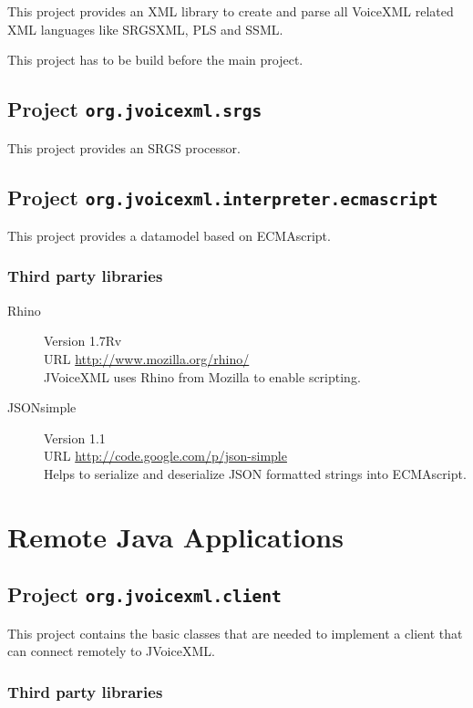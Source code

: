 \documentclass[11pt,a4paper]{article}
\begin{document}
This project provides an XML library to create and parse all VoiceXML related
XML languages like SRGSXML, PLS and SSML.

This project has to be build before the main project.

\subsection{Project \texttt{org.jvoicexml.srgs}}
\label{sec:org.jvoicexml.srgs}

This project provides an SRGS processor.

\subsection{Project \texttt{org.jvoicexml.interpreter.ecmascript}}
\label{sec:org.jvoicexml.srgs}

This project provides a datamodel based on ECMAscript.

\subsubsection{Third party libraries}
\label{sec:config-third-party-libr}

\begin{description}
\item[Rhino] Version 1.7Rv \\
URL \url{http://www.mozilla.org/rhino/} \\
JVoiceXML uses Rhino from Mozilla to enable scripting.
\item[JSONsimple] Version 1.1 \\
URL \url{http://code.google.com/p/json-simple} \\
Helps to serialize and deserialize JSON formatted strings into ECMAscript.
\end{description}

\section{Remote Java Applications}
\subsection{Project \texttt{org.jvoicexml.client}}

This project contains the basic classes that are needed to implement a
client that can connect remotely to JVoiceXML.

\subsubsection{Third party libraries}
\end{document}
